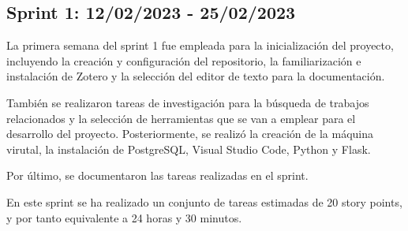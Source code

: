 \subsection{Sprint 1: 12/02/2023 - 25/02/2023}
La primera semana del sprint 1 fue empleada para la inicialización del proyecto, incluyendo la creación y configuración del repositorio, la familiarización e instalación de Zotero y la selección del editor de texto para la documentación. 

También se realizaron tareas de investigación para la búsqueda de trabajos relacionados y la selección de herramientas que se van a emplear para el desarrollo del proyecto.
Posteriormente, se realizó la creación de la máquina virutal, la instalación de PostgreSQL, Visual Studio Code, Python y Flask.

Por último, se documentaron las tareas realizadas en el sprint.

En este sprint se ha realizado un conjunto de tareas estimadas de 20 story points, y por tanto equivalente a 24 horas y 30 minutos.

